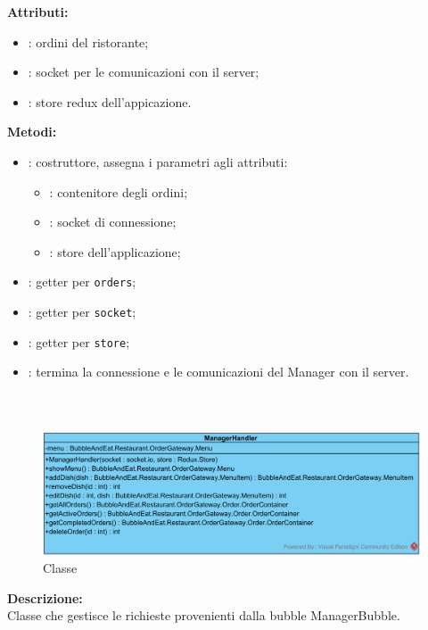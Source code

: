 \textbf{Attributi:}
\begin{itemize}
	\item {}: ordini del ristorante;
	\item {}: socket per le comunicazioni con il server;
	\item {}: store redux dell'appicazione.
\end{itemize}

\textbf{Metodi:}
\begin{itemize}
	\item {}: costruttore, assegna i parametri agli attributi:
	\begin{itemize}
		\item {}: contenitore degli ordini;
		\item {}: socket di connessione;
		\item {}: store dell'applicazione;
	\end{itemize}
	\item {}: getter per \texttt{orders};
	\item {}: getter per \texttt{socket};
	\item {}: getter per \texttt{store};
	\item {}: termina la connessione e le comunicazioni del Manager con il server.
\end{itemize}

\subparagraph[::ManagerHandler]{\class}\mbox{}\\ \label{\class}
\begin{figure}[H]
	\centering
		\includegraphics[width=15cm]{./diagrammi/demo/server/handlers/managerhandler.png}
	\caption{Classe \class}
\end{figure}
\textbf{Descrizione:}\\
Classe che gestisce le richieste provenienti dalla bubble ManagerBubble.

